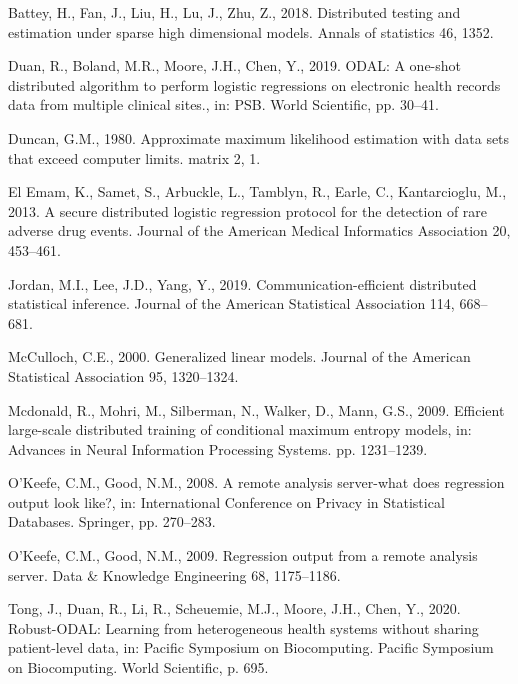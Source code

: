 \documentclass[]{elsarticle} %
\newlength{\cslhangindent}
\newenvironment{cslreferences}%
  {\setlength{\parindent}{0pt}%
  \everypar{\setlength{\hangindent}{\cslhangindent}}\ignorespaces}%
  {\par}
\begin{document}
\hypertarget{refs}{}
\begin{cslreferences}
\leavevmode\hypertarget{ref-battey2018distributed}{}%
Battey, H., Fan, J., Liu, H., Lu, J., Zhu, Z., 2018. Distributed testing
and estimation under sparse high dimensional models. Annals of
statistics 46, 1352.

\leavevmode\hypertarget{ref-duan2019odal}{}%
Duan, R., Boland, M.R., Moore, J.H., Chen, Y., 2019. ODAL: A one-shot
distributed algorithm to perform logistic regressions on electronic
health records data from multiple clinical sites., in: PSB. World
Scientific, pp. 30--41.

\leavevmode\hypertarget{ref-duncan1980approximate}{}%
Duncan, G.M., 1980. Approximate maximum likelihood estimation with data
sets that exceed computer limits. matrix 2, 1.

\leavevmode\hypertarget{ref-spark}{}%
El Emam, K., Samet, S., Arbuckle, L., Tamblyn, R., Earle, C.,
Kantarcioglu, M., 2013. A secure distributed logistic regression
protocol for the detection of rare adverse drug events. Journal of the
American Medical Informatics Association 20, 453--461.

\leavevmode\hypertarget{ref-jordan2019communication}{}%
Jordan, M.I., Lee, J.D., Yang, Y., 2019. Communication-efficient
distributed statistical inference. Journal of the American Statistical
Association 114, 668--681.

\leavevmode\hypertarget{ref-mcculloch2000generalized}{}%
McCulloch, C.E., 2000. Generalized linear models. Journal of the
American Statistical Association 95, 1320--1324.

\leavevmode\hypertarget{ref-mcdonald2009efficient}{}%
Mcdonald, R., Mohri, M., Silberman, N., Walker, D., Mann, G.S., 2009.
Efficient large-scale distributed training of conditional maximum
entropy models, in: Advances in Neural Information Processing Systems.
pp. 1231--1239.

\leavevmode\hypertarget{ref-o2008remote}{}%
O'Keefe, C.M., Good, N.M., 2008. A remote analysis server-what does
regression output look like?, in: International Conference on Privacy in
Statistical Databases. Springer, pp. 270--283.

\leavevmode\hypertarget{ref-o2009regression}{}%
O'Keefe, C.M., Good, N.M., 2009. Regression output from a remote
analysis server. Data \& Knowledge Engineering 68, 1175--1186.

\leavevmode\hypertarget{ref-tong2020robust}{}%
Tong, J., Duan, R., Li, R., Scheuemie, M.J., Moore, J.H., Chen, Y.,
2020. Robust-ODAL: Learning from heterogeneous health systems without
sharing patient-level data, in: Pacific Symposium on Biocomputing.
Pacific Symposium on Biocomputing. World Scientific, p. 695.


\end{cslreferences}
\end{document}
